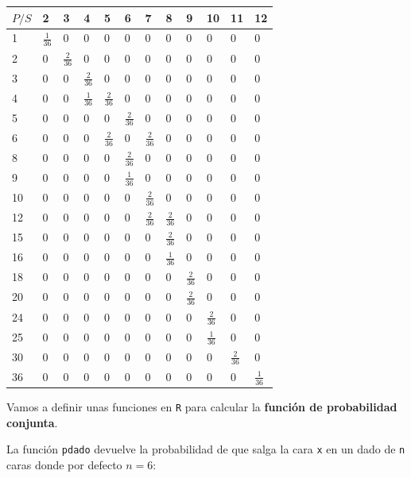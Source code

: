 \documentclass[]{book}
\newenvironment{Shaded}{\begin{snugshade}}{\end{snugshade}}
\newcommand{\ControlFlowTok}[1]{\textcolor[rgb]{0.13,0.29,0.53}{\textbf{#1}}}
\newcommand{\DataTypeTok}[1]{\textcolor[rgb]{0.13,0.29,0.53}{#1}}
\newcommand{\DecValTok}[1]{\textcolor[rgb]{0.00,0.00,0.81}{#1}}
\newcommand{\KeywordTok}[1]{\textcolor[rgb]{0.13,0.29,0.53}{\textbf{#1}}}
\newcommand{\NormalTok}[1]{#1}
\newcommand{\OperatorTok}[1]{\textcolor[rgb]{0.81,0.36,0.00}{\textbf{#1}}}
\newcommand{\StringTok}[1]{\textcolor[rgb]{0.31,0.60,0.02}{#1}}
\begin{document}
\begin{longtable}[]{@{}llllllllllll@{}}
\toprule
\(P/S\) & 2 & 3 & 4 & 5 & 6 & 7 & 8 & 9 & 10 & 11 & 12\tabularnewline
\midrule
\endhead
1 & \(\frac{1}{36}\) & 0 & 0 & 0 & 0 & 0 & 0 & 0 & 0 & 0 & 0\tabularnewline
2 & 0 & \(\frac{2}{36}\) & 0 & 0 & 0 & 0 & 0 & 0 & 0 & 0 & 0\tabularnewline
3 & 0 & 0 & \(\frac{2}{36}\) & 0 & 0 & 0 & 0 & 0 & 0 & 0 & 0\tabularnewline
4 & 0 & 0 & \(\frac{1}{36}\) & \(\frac{2}{36}\) & 0 & 0 & 0 & 0 & 0 & 0 & 0\tabularnewline
5 & 0 & 0 & 0 & 0 & \(\frac{2}{36}\) & 0 & 0 & 0 & 0 & 0 & 0\tabularnewline
6 & 0 & 0 & 0 & \(\frac{2}{36}\) & 0 & \(\frac{2}{36}\) & 0 & 0 & 0 & 0 & 0\tabularnewline
8 & 0 & 0 & 0 & 0 & \(\frac{2}{36}\) & 0 & 0 & 0 & 0 & 0 & 0\tabularnewline
9 & 0 & 0 & 0 & 0 & \(\frac{1}{36}\) & 0 & 0 & 0 & 0 & 0 & 0\tabularnewline
10 & 0 & 0 & 0 & 0 & 0 & \(\frac{2}{36}\) & 0 & 0 & 0 & 0 & 0\tabularnewline
12 & 0 & 0 & 0 & 0 & 0 & \(\frac{2}{36}\) & \(\frac{2}{36}\) & 0 & 0 & 0 & 0\tabularnewline
15 & 0 & 0 & 0 & 0 & 0 & 0 & \(\frac{2}{36}\) & 0 & 0 & 0 & 0\tabularnewline
16 & 0 & 0 & 0 & 0 & 0 & 0 & \(\frac{1}{36}\) & 0 & 0 & 0 & 0\tabularnewline
18 & 0 & 0 & 0 & 0 & 0 & 0 & 0 & \(\frac{2}{36}\) & 0 & 0 & 0\tabularnewline
20 & 0 & 0 & 0 & 0 & 0 & 0 & 0 & \(\frac{2}{36}\) & 0 & 0 & 0\tabularnewline
24 & 0 & 0 & 0 & 0 & 0 & 0 & 0 & 0 & \(\frac{2}{36}\) & 0 & 0\tabularnewline
25 & 0 & 0 & 0 & 0 & 0 & 0 & 0 & 0 & \(\frac{1}{36}\) & 0 & 0\tabularnewline
30 & 0 & 0 & 0 & 0 & 0 & 0 & 0 & 0 & 0 & \(\frac{2}{36}\) & 0\tabularnewline
36 & 0 & 0 & 0 & 0 & 0 & 0 & 0 & 0 & 0 & 0 & \(\frac{1}{36}\)\tabularnewline
\bottomrule
\end{longtable}

Vamos a definir unas funciones en \texttt{R} para calcular la \textbf{función de probabilidad conjunta}.

La función \texttt{pdado} devuelve la probabilidad de que salga la cara \texttt{x} en un dado de \texttt{n} caras donde por defecto \(n=6\):

\begin{Shaded}
\end{Shaded}
\end{document}
